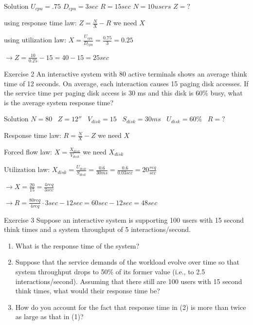 \documentclass[]{beamer}
\begin{document}
\begin{frame}{Solution}
$U_{cpu} = .75$ \hspace{.3cm}
$D_{cpu} = 3 sec$ \hspace{.3cm}
$R = 15 sec$ \hspace{.3cm}
$N = 10 users$ \hspace{.3cm}
$Z = ?$

using response time law: $Z=\frac{N}{X} - R$ we need $X$

using utilization law: $X=\frac{U_{cpu}}{D_{cpu}}=\frac{0.75}{3}=0.25$

$\rightarrow Z=\frac{10}{0.25}-15=40-15=25 sec$
\end{frame}

\begin{frame}{Exercise 2 \cite{lazowska1984quantitative}}
An interactive system with 80 active terminals shows an average think
time of 12 seconds. On average, each interaction causes 15 paging
disk accesses. If the service time per paging disk access is 30 ms and
this disk is 60\% busy, what is the average system response time?
\end{frame}

\begin{frame}{Solution}
$N=80$ \ $Z=12''$ \ $V_{disk}=15$ \ $S_{disk}=30ms$ \ $U_{disk} = 60\%$ \ $R=?$

Response time law: $R = \frac{N}{X} - Z$ we need $X$

Forced flow law: $X = \frac{X_{disk}}{V_{disk}}$ we need $X_{disk}$

Utilization law: $X_{disk} = \frac{U_{disk}}{S_{disk}} = \frac{0.6}{30ms} = \frac{0.6}{0.03sec} = 20 \frac{req}{sec}$

$\rightarrow X = \frac{20}{15} = \frac{4req}{3sec}$

$\rightarrow R = \frac{80 req}{4req}\cdot 3sec - 12sec = 60sec - 12sec = 48 sec$
\end{frame}

\begin{frame}{Exercise 3 \cite{lazowska1984quantitative}}
Suppose an interactive system is supporting 100 users with 15 second
think times and a system throughput of 5 interactions/second.
\begin{enumerate}
\item What is the response time of the system?
\item Suppose that the service demands of the workload evolve over time
so that system throughput drops to 50\% of its former value (i.e., to
2.5 interactions/second). Assuming that there still are 100 users
with 15 second think times, what would their response time be?
\item How do you account for the fact that response time in (2) is more
than twice as large as that in (1)?
\end{enumerate}
\end{frame}
\end{document}
